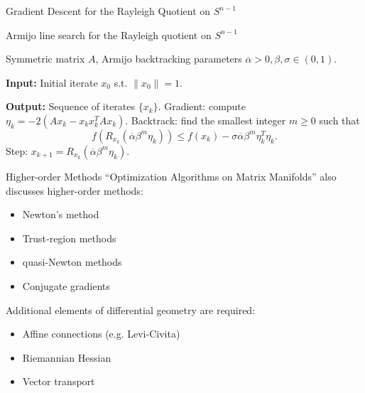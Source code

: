 \documentclass[xcolor=dvipsnames,t]{beamer} %
\begin{document}
\begin{frame}{Gradient Descent for the Rayleigh Quotient on $S^{n-1}$}
   
   \begin{algorithm}[H]
      \caption{Armijo line search for the Rayleigh quotient on $S^{n-1}$}
      \begin{algorithmic}[1] %
         \Require Symmetric matrix $A$, Armijo backtracking parameters $\overline{\alpha}>0,\beta,\sigma\in(0,1)$.
         \item[\textbf{Input:}] Initial iterate $x_0$ s.t. $\|x_0\|=1$. %
         \item[\textbf{Output:}] Sequence of iterates $\{x_k\}$.
            \State Gradient: compute ${\eta_k = -2(Ax_k-x_kx_k^TAx_k)}.$
            \State Backtrack: find the smallest integer $m\ge 0$ such that
            \[ f(R_{x_k}(\overline{\alpha}\beta^m\eta_k))\le f(x_k) - \sigma\overline{\alpha}\beta^m\eta_k^T\eta_k. \] 
            \State Step: $x_{k+1}=R_{x_k}(\overline{\alpha}\beta^m\eta_k)$.
         \EndFor
      \end{algorithmic}
   \end{algorithm}

\end{frame}


\begin{frame}{Higher-order Methods}
   ``Optimization Algorithms on Matrix Manifolds'' also discusses higher-order methods:
   \begin{itemize}
      \item Newton's method
      \item Trust-region methods
      \item quasi-Newton methods
      \item Conjugate gradients\\[1em]
   \end{itemize}

   Additional elements of differential geometry are required:
   \begin{itemize}
      \item Affine connections (e.g. Levi-Civita)
      \item Riemannian Hessian
      \item Vector transport
   \end{itemize}

\end{frame}
\end{document}
